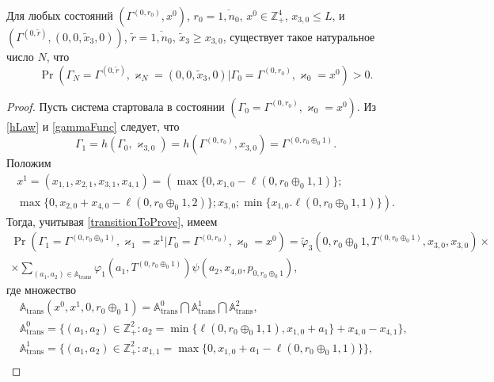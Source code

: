 \documentclass[a4paper,12pt,russian]{extarticle}
\begin{document}
\begin{lemma}
Для любых состояний $(\Gamma^{(0,r_0)},x^0)$, $r_0=\overline{1,n_0}$, $x^0 \in \mathbb{Z}_+^4$, $x_{3,0} \leqslant L$, и $(\Gamma^{(0,\tilde{r})},(0,0,\tilde{x}_3,0))$, $\tilde{r} = \overline{1,n_0}$, $\tilde{x}_3\geqslant x_{3,0}$, существует такое натуральное число $N$, что 
\begin{equation*}
\Pr(\Gamma_{N}=\Gamma^{(0,\tilde{r} )}, \varkappa_{N}=(0,0,\tilde{x}_3,0)|
\Gamma_{0}=\Gamma^{(0,r_0)}, \varkappa_{0}=x^0)>0.
\end{equation*}
\label{class:1}
\end{lemma}
\begin{proof}
Пусть система стартовала в состоянии $(\Gamma_{0}=\Gamma^{(0,r_0)}, \varkappa_{0}=x^0)$.
Из \eqref{hLaw} и \eqref{gammaFunc} следует, что 
\begin{equation*}
\Gamma_1 = h(\Gamma_0,\varkappa_{3,0}) = h(\Gamma^{(0,r_0)}, x_{3,0}) = \Gamma^{(0,r_0\oplus_{0}1)}.
\end{equation*}
Положим
\begin{multline*}
x^1 =(x_{1,1},x_{2,1},x_{3,1},x_{4,1}) =\left(\max{\{0, x_{1,0} - \ell(0,r_0\oplus_{0}1,1)\}}; \right. \\
\left. \max{\{0, x_{2,0} + x_{4,0}  - \ell(0,r_0\oplus_{0}1,2)\}}; x_{3,0};\min{\{x_{1,0}. \ell(0,r_0\oplus_{0}1,1)\}}\right).
\end{multline*}
Тогда, учитывая \eqref{transitionToProve}, имеем
\begin{multline*}
\Pr (\Gamma_{1}=\Gamma^{(0,r_0\oplus_{0}1)},\varkappa_{1}=x^1 | \Gamma_{0}=\Gamma^{(0,r_0)},\varkappa_0=x^0)=\widetilde{\varphi}_3(0,r_0\oplus_{0}1,T^{(0,r_0\oplus_{0}1)},x_{3,0},x_{3,0})\times \\
\times
\sum_{(a_1,a_2)\in {\mathbb A}_{\mathrm{trans}}}\varphi_1(a_1,T^{(0,r_0\oplus_{0}1)})  \psi(a_2,x_{4,0}, p_{0,r_0\oplus_{0}1}),
\end{multline*}
где множество 
\begin{align*}
&{\mathbb A}_{\mathrm{trans}}(x^0,x^1,0,r_0\oplus_{0}1) = {\mathbb A}_{\mathrm{trans}}^0 \bigcap {\mathbb A}_{\mathrm{trans}}^1\bigcap {\mathbb A}_{\mathrm{trans}}^2,\\
&{\mathbb A}_{\mathrm{trans}}^0 = \{(a_1,a_2) \in \mathbb{Z}_+^2 \colon a_2 = \min{\{\ell(0,r_0\oplus_{0}1,1), x_{1,0}+a_1}\} +x_{4,0}-x_{4,1}\},\\
&{\mathbb A}_{\mathrm{trans}}^1 = \{(a_1,a_2) \in \mathbb{Z}_+^2 \colon x_{1,1}=\max{\{0,x_{1,0}+a_1-\ell(0,r_0\oplus_{0}1,1)\}}\},\\

\end{align*}
\end{proof}
\end{document}
